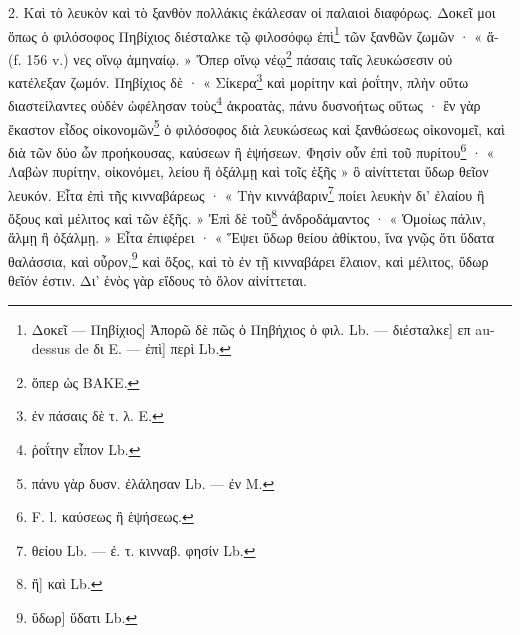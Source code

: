 \documentclass[landscape, a4paper, 11pt, oneside, polutonikogreek, french]{article}
\begin{document}
2. Καὶ τὸ λευκὸν καὶ τὸ ξανθὸν πολλάκις ἐκάλεσαν οἱ παλαιοὶ διαφόρως. Δοκεῖ μοι ὅπως ὁ φιλόσοφος Πηβίχιος διέσταλκε τῷ φιλοσόφῳ ἐπὶ\footnote{Δοκεῖ --- Πηβίχιος] Ἀπορῶ δὲ πῶς ὁ Πηβήχιος ὁ φιλ. Lb. --- διέσταλκε] επ au-dessus de δι E. --- ἐπὶ] περὶ Lb.} τῶν ξανθῶν ζωμῶν · « ἄ- (f. 156 v.) νες οἴνῳ ἀμηναίῳ. » Ὅπερ οἴνῳ νέῳ\footnote{ὅπερ ὡς BAKE.} πάσαις ταῖς λευκώσεσιν οὐ κατέλεξαν ζωμόν. Πηβίχιος δὲ · « Σίκερα\footnote{ἐν πάσαις δὲ τ. λ. E.} καὶ μορίτην καὶ ῥοΐτην, πλὴν οὕτω διαστείλαντες οὐδὲν ὠφέλησαν τοὺς\footnote{ῥοΐτην εἶπον Lb.} ἀκροατὰς, πάνυ δυσνοήτως οὕτως · ἓν γὰρ ἕκαστον εἶδος οἰκονομῶν\footnote{πάνυ γὰρ δυσν. ἐλάλησαν Lb. --- ἐν M.} ὁ φιλόσοφος διὰ λευκώσεως καὶ ξανθώσεως οἰκονομεῖ, καὶ διὰ τῶν δύο ὧν προήκουσας, καύσεων ἢ ἑψήσεων. Φησὶν οὖν ἐπὶ τοῦ πυρίτου\footnote{F. l. καύσεως ἢ ἑψήσεως.} · « Λαβὼν πυρίτην, οἰκονόμει, λείου ἢ ὀξάλμῃ καὶ τοῖς ἑξῆς » ὃ αἰνίττεται ὕδωρ θεῖον λευκόν. Εἶτα ἐπὶ τῆς κινναβάρεως · « Τὴν κιννάβαριν\footnote{θείου Lb. --- ἐ. τ. κινναβ. φησίν Lb.} ποίει λευκὴν δι' ἐλαίου ἢ ὄξους καὶ μέλιτος καὶ τῶν ἑξῆς. » Ἐπὶ δὲ τοῦ\footnote{ἢ] καὶ Lb.} ἀνδροδάμαντος · « Ὁμοίως πάλιν, ἅλμῃ ἢ ὀξάλμῃ. » Εἶτα ἐπιφέρει · « Ἕψει ὕδωρ θείου ἀθίκτου, ἵνα γνῷς ὅτι ὕδατα θαλάσσια, καὶ οὖρον,\footnote{ὕδωρ] ὕδατι Lb.} καὶ ὄξος, καὶ τὸ ἐν τῇ κινναβάρει ἔλαιον, καὶ μέλιτος, ὕδωρ θεῖόν ἐστιν. Δι' ἑνὸς γὰρ εἴδους τὸ ὅλον αἰνίττεται.
\end{document}
